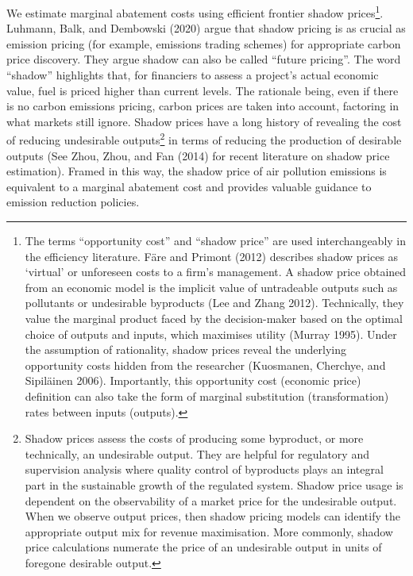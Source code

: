 \documentclass[
  10pt,
]{article}
\begin{document}
We estimate marginal abatement costs using efficient frontier shadow
prices\footnote{The terms ``opportunity cost'' and ``shadow price'' are
  used interchangeably in the efficiency literature. Färe and Primont
  (2012) describes shadow prices as `virtual' or unforeseen costs to a
  firm's management. A shadow price obtained from an economic model is
  the implicit value of untradeable outputs such as pollutants or
  undesirable byproducts (Lee and Zhang 2012). Technically, they value
  the marginal product faced by the decision-maker based on the optimal
  choice of outputs and inputs, which maximises utility (Murray 1995).
  Under the assumption of rationality, shadow prices reveal the
  underlying opportunity costs hidden from the researcher (Kuosmanen,
  Cherchye, and Sipiläinen 2006). Importantly, this opportunity cost
  (economic price) definition can also take the form of marginal
  substitution (transformation) rates between inputs (outputs).}.
Luhmann, Balk, and Dembowski (2020) argue that shadow pricing is as
crucial as emission pricing (for example, emissions trading schemes) for
appropriate carbon price discovery. They argue shadow can also be called
``future pricing''. The word ``shadow'' highlights that, for financiers
to assess a project's actual economic value, fuel is priced higher than
current levels. The rationale being, even if there is no carbon
emissions pricing, carbon prices are taken into account, factoring in
what markets still ignore. Shadow prices have a long history of
revealing the cost of reducing undesirable outputs\footnote{Shadow
  prices assess the costs of producing some byproduct, or more
  technically, an undesirable output. They are helpful for regulatory
  and supervision analysis where quality control of byproducts plays an
  integral part in the sustainable growth of the regulated system.
  Shadow price usage is dependent on the observability of a market price
  for the undesirable output. When we observe output prices, then shadow
  pricing models can identify the appropriate output mix for revenue
  maximisation. More commonly, shadow price calculations numerate the
  price of an undesirable output in units of foregone desirable output.}
in terms of reducing the production of desirable outputs (See Zhou,
Zhou, and Fan (2014) for recent literature on shadow price estimation).
Framed in this way, the shadow price of air pollution emissions is
equivalent to a marginal abatement cost and provides valuable guidance
to emission reduction policies.
\end{document}
